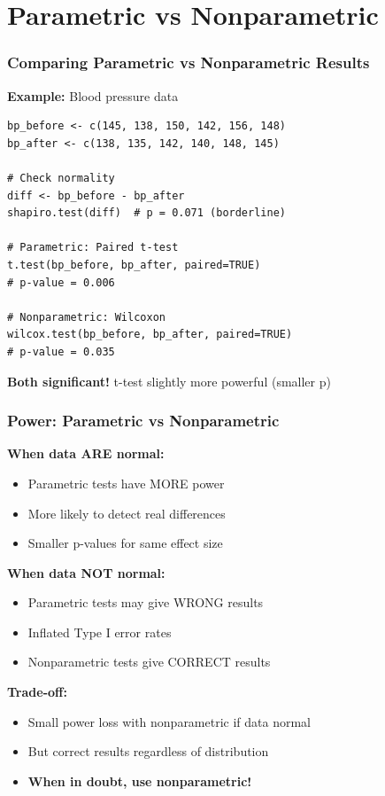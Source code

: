 \documentclass{beamer}
\begin{document}
\section{Parametric vs Nonparametric}

\begin{frame}[fragile]
\frametitle{Comparing Parametric vs Nonparametric Results}
\textbf{Example:} Blood pressure data

\vspace{0.3cm}
\begin{small}
\begin{verbatim}
bp_before <- c(145, 138, 150, 142, 156, 148)
bp_after <- c(138, 135, 142, 140, 148, 145)

# Check normality
diff <- bp_before - bp_after
shapiro.test(diff)  # p = 0.071 (borderline)

# Parametric: Paired t-test
t.test(bp_before, bp_after, paired=TRUE)
# p-value = 0.006

# Nonparametric: Wilcoxon
wilcox.test(bp_before, bp_after, paired=TRUE)
# p-value = 0.035
\end{verbatim}
\end{small}

\textbf{Both significant!} t-test slightly more powerful (smaller p)
\end{frame}

\begin{frame}
\frametitle{Power: Parametric vs Nonparametric}

\textbf{When data ARE normal:}
\begin{itemize}
\item Parametric tests have MORE power
\item More likely to detect real differences
\item Smaller p-values for same effect size
\end{itemize}

\vspace{0.5cm}
\textbf{When data NOT normal:}
\begin{itemize}
\item Parametric tests may give WRONG results
\item Inflated Type I error rates
\item Nonparametric tests give CORRECT results
\end{itemize}

\vspace{0.5cm}
\textbf{Trade-off:}
\begin{itemize}
\item Small power loss with nonparametric if data normal
\item But correct results regardless of distribution
\item \textbf{When in doubt, use nonparametric!}
\end{itemize}
\end{frame}
\end{document}
